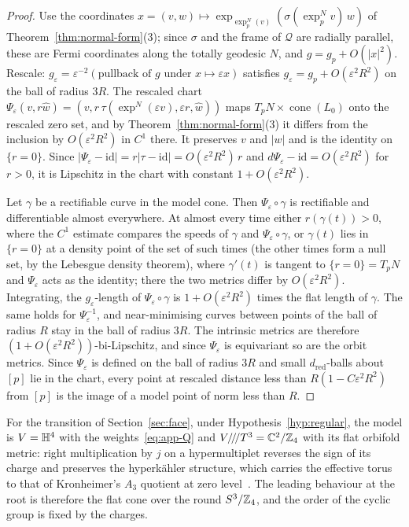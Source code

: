 \begin{proof}
Use the coordinates $x=(v,w)\mapsto\exp_{\exp^N_p(v)}(\sigma(\exp^N_pv)\,w)$ of
Theorem~\ref{thm:normal-form}(3); since $\sigma$ and the frame of $\mathcal Q$ are radially
parallel, these are Fermi coordinates along the totally geodesic $N$, and $g=g_p+O(|x|^2)$.
Rescale: $g_\varepsilon=\varepsilon^{-2}(\text{pullback of }g\text{ under }x\mapsto\varepsilon x)$
satisfies $g_\varepsilon=g_p+O(\varepsilon^2R^2)$ on the ball of radius $3R$. The rescaled chart
$\Psi_\varepsilon(v,r\hat w)=(v,r\,\tau(\exp^N(\varepsilon v),\varepsilon r,\hat w))$ maps
$T_pN\times\operatorname{cone}(L_0)$ onto the rescaled zero set, and by
Theorem~\ref{thm:normal-form}(3) it differs from the inclusion by $O(\varepsilon^2R^2)$ in $C^1$
there. It preserves $v$ and $|w|$ and is the identity on $\{r=0\}$. Since
$|\Psi_\varepsilon-\mathrm{id}|=r|\tau-\mathrm{id}|=O(\varepsilon^2R^2)\,r$ and
$d\Psi_\varepsilon-\mathrm{id}=O(\varepsilon^2R^2)$ for $r>0$, it is Lipschitz in the chart with
constant $1+O(\varepsilon^2R^2)$.

Let $\gamma$ be a rectifiable curve in the model cone. Then $\Psi_\varepsilon\circ\gamma$ is
rectifiable and differentiable almost everywhere. At almost every time either
$r(\gamma(t))>0$, where the $C^1$ estimate compares the speeds of $\gamma$ and
$\Psi_\varepsilon\circ\gamma$, or $\gamma(t)$ lies in $\{r=0\}$ at a density point of the set of
such times (the other times form a null set, by the Lebesgue density theorem), where $\gamma'(t)$ is tangent to $\{r=0\}=T_pN$ and $\Psi_\varepsilon$ acts as the
identity; there the two metrics differ by $O(\varepsilon^2R^2)$. Integrating, the
$g_\varepsilon$-length of $\Psi_\varepsilon\circ\gamma$ is $1+O(\varepsilon^2R^2)$ times the flat
length of $\gamma$. The same holds for $\Psi_\varepsilon^{-1}$, and near-minimising curves between
points of the ball of radius $R$ stay in the ball of radius $3R$. The intrinsic metrics are
therefore $(1+O(\varepsilon^2R^2))$-bi-Lipschitz, and since $\Psi_\varepsilon$ is equivariant so
are the orbit metrics. Since $\Psi_\varepsilon$ is defined on the ball of radius $3R$ and small
$d_{\mathrm{red}}$-balls about $[p]$ lie in the chart, every point at rescaled distance less than
$R(1-C\varepsilon^2R^2)$ from $[p]$ is the image of a model point of norm less than $R$.
\end{proof}

For the transition of Section~\ref{sec:face}, under Hypothesis~\ref{hyp:regular}, the model is
$V=\mathbb H^4$ with the weights~\eqref{eq:app-Q} and $V/\!/\!/T^3=\mathbb C^2/\mathbb Z_4$ with its flat orbifold
metric: right multiplication by $j$ on a hypermultiplet reverses the sign of its charge and
preserves the hyperk\"ahler structure, which carries the effective torus to that of Kronheimer's
$A_3$ quotient at zero level~\cite{Kronheimer:1989}. The leading behaviour at the root is
therefore the flat cone over the round $S^3/\mathbb Z_4$, and the order of the cyclic group is fixed by
the charges.

